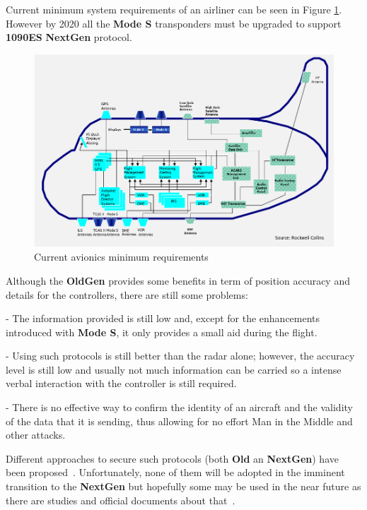 \documentclass[../main.tex]{subfiles}
\begin{document}
Current minimum system requirements of an airliner can be seen in Figure \ref{fig:modern}. However by 2020 all the \textbf{Mode S} transponders must be upgraded to support \textbf{1090ES} \textbf{NextGen} protocol.

\begin{figure}[htp]
  \centering
  \includegraphics[scale=0.63]{images/current_avionics.png}
  \caption{Current avionics minimum requirements}
  \label{fig:modern}
\end{figure}

Although the \textbf{OldGen} provides some benefits in term of position accuracy and details for the controllers, there are still some problems:

- The information provided is still low and, except for the enhancements introduced with \textbf{Mode S}, it only provides a small aid during the flight.

- Using such protocols is still better than the radar alone; however, the accuracy level is still low and usually not much information can be carried so a intense verbal interaction with the controller is still required.

- There is no effective way to confirm the identity of an aircraft and the validity of the data that it is sending, thus allowing for no effort Man in the Middle and other attacks.

Different approaches to secure such protocols (both \textbf{Old} an \textbf{NextGen}) have been proposed~\cite{nextgenenc}. Unfortunately, none of them will be adopted in the imminent transition to the \textbf{NextGen} but hopefully some may be used in the near future as there are studies and official documents about that~\cite{adsbimp}.
\end{document}
